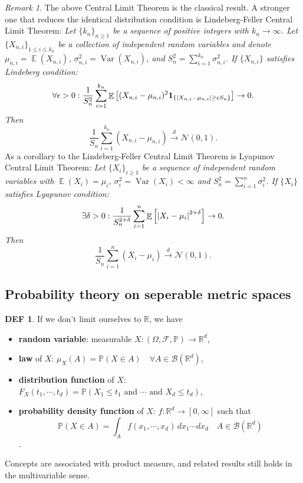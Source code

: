 \documentclass[hidelinks,11pt]{article}
\theoremstyle{definition}
\newtheorem*{defin}{DEF}
\theoremstyle{dotles}
\theoremstyle{dotless}
\theoremstyle{remark}
\newtheorem*{remark}{Remark}
\DeclareMathOperator{\Var}{Var}
\DeclareMathOperator{\E}{\mathbb{E}}
\begin{document}
\begin{remark}
The above Central Limit Theorem is the classical result. A stronger one that reduces the identical distribution condition is Lindeberg-Feller Central Limit Theorem:\smallbreak
\textit{Let $\{k_n\}_{n\geq1}$ be a sequence of positive integers with $k_n\to\infty$. Let $\{X_{n,i}\}_{1\leq i\leq k_n}$ be a collection of independent random variables and denote $\mu_{n,i}=\E(X_{n,i})$, $\sigma_{n,i}^2=\Var(X_{n,i})$, and $S_n^2=\sum_{i=1}^{k_n}\sigma_{n,i}^2$. If $\{X_{n,i}\}$ satisfies Lindeberg condition:}
\[\forall\epsilon>0:\frac{1}{S_n^2}\sum_{i=1}^{k_n}\E\left[(X_{n,i}-\mu_{n,i})^2\textbf{1}_{\{\abs{X_{n,i}-\mu_{n,i}}\geq\epsilon S_n\}}\right]\to0.\]
\textit{Then}
\[\frac{1}{S_n}\sum_{i=1}^{k_n}(X_{n,i}-\mu_{n,i})\xrightarrow{d}\mathcal{N}(0,1).\]
As a corollary to the Lindeberg-Feller Central Limit Theorem is Lyapunov Central Limit Theorem:\smallbreak
\textit{Let $\{X_i\}_{i\geq1}$ be a sequence of independent random variables with $\E(X_i)=\mu_i$, $\sigma_i^2=\Var(X_i)<\infty$ and $S_n^2=\sum_{i=1}^n\sigma_i^2$. If $\{X_i\}$ satisfies Lyapunov condition:}
\[\exists\delta>0:\frac{1}{S_n^{2+\delta}}\sum_{i=1}^n\E\left[\abs{X_i-\mu_i}^{2+\delta}\right]\to0.\]
\textit{Then}
\[\frac{1}{S_n}\sum_{i=1}^n(X_i-\mu_i)\xrightarrow{d}\mathcal{N}(0,1).\]
\end{remark}

\bigbreak
\subsection{Probability theory on seperable metric spaces}
\begin{defin}
If we don't limit ourselves to $\mathbb{R}$, we have\begin{itemize}
    \item \textbf{random variable}: measurable $X:(\Omega,\mathcal{F},\mathbb{P})\to\mathbb{R}^d$,
    \item \textbf{law} of $X$: $\mu_X(A)=\mathbb{P}(X\in A)\quad\forall A\in\mathcal{B}(\mathbb{R}^d)$,
    \item \textbf{distribution function} of $X$: $F_X(t_1,\cdots,t_d)=\mathbb{P}(X_1\leq t_1\textrm{ and }\cdots\textrm{ and }X_d\leq t_d)$,
    \item \textbf{probability density function} of $X$: $f:\mathbb{R}^d\to[0,\infty]$ such that
    \[\mathbb{P}(X\in A)=\int_Af(x_1,\cdots,x_d)\,dx_1\cdots dx_d\quad A\in\mathcal{B}(\mathbb{R}^d)\].
\end{itemize}
Concepts are associated with product measure, and related results still holds in the multivariable sense.
\end{defin}
\end{document}
